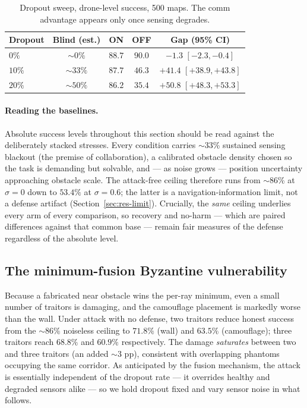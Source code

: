 \begin{table}[t]\centering
\caption{Dropout sweep, drone-level success, 500 maps. The comm advantage
appears only once sensing degrades.}
\label{tab:dropout}
\begin{tabular}{lcccc}
\toprule
Dropout & Blind (est.) & ON & OFF & Gap (95\% CI) \\
\midrule
$0\%$  & ${\sim}0\%$  & $88.7$ & $90.0$ & $-1.3$ $[-2.3,-0.4]$ \\
$10\%$ & ${\sim}33\%$ & $87.7$ & $46.3$ & $+41.4$ $[+38.9,+43.8]$ \\
$20\%$ & ${\sim}50\%$ & $86.2$ & $35.4$ & $+50.8$ $[+48.3,+53.3]$ \\
\bottomrule
\end{tabular}
\end{table}

\paragraph{Reading the baselines.}
Absolute success levels throughout this section should be read against the
deliberately stacked stresses. Every condition carries $\sim$33\% sustained
sensing blackout (the premise of collaboration), a calibrated obstacle
density chosen so the task is demanding but solvable, and --- as noise grows
--- position uncertainty approaching obstacle scale. The attack-free
ceiling therefore runs from $\sim$86\% at $\sigma=0$ down to $53.4\%$ at
$\sigma=0.6$; the latter is a navigation-information limit, not a defense
artifact (Section~\ref{sec:res-limit}). Crucially, the \emph{same} ceiling
underlies every arm of every comparison, so recovery and no-harm --- which
are paired differences against that common base --- remain fair measures of
the defense regardless of the absolute level.

\subsection{The minimum-fusion Byzantine vulnerability}\label{sec:res-vuln}
Because a fabricated near obstacle wins the per-ray minimum, even a small
number of traitors is damaging, and the camouflage placement is markedly
worse than the wall. Under attack with no defense, two traitors reduce
honest success from the $\sim\!86\%$ noiseless ceiling to $71.8\%$ (wall)
and $63.5\%$ (camouflage); three traitors reach $68.8\%$ and $60.9\%$
respectively. The damage \emph{saturates} between two and three traitors
(an added $\sim\!3$ pp), consistent with overlapping phantoms occupying the
same corridor. As anticipated by the fusion mechanism, the attack is
essentially independent of the dropout rate --- it overrides healthy and
degraded sensors alike --- so we hold dropout fixed and vary sensor noise
in what follows.

